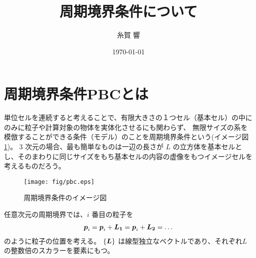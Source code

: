 \documentclass[a4j,12pt]{jarticle}
\title{周期境界条件について}
\author{糸賀 響}
\date{\today}
\def\vector#1{\mbox{\boldmath $#1$}}
\begin{document}
\maketitle \thispagestyle{empty}
\section{周期境界条件PBCとは}
単位セルを連続すると考えることで、有限大きさの１つセル（基本セル）の中にのみに粒子や計算対象の物体を実体化させるにも関わらず、
無限サイズの系を模倣することができる条件（モデル）のことを周期境界条件という(イメージ図\ref{fig:pbc})。
3 次元の場合、最も簡単なものは一辺の長さが $L$ の立方体を基本セルとし、そのまわりに同じサイズをもち基本セルの内容の虚像をもつイメージセルを考えるものだろう。
\begin{figure}[htbp]
   \begin{center}
   \texttt{[image: fig/pbc.eps]}
   \end{center}
   \caption{
   \label{fig:pbc}
      周期境界条件のイメージ図
   }
\end{figure}

任意次元の周期境界では、$i$ 番目の粒子を
\begin{eqnarray}
   \vector{p}_i = \vector{p}_i+\vector{L_1} = \vector{p}_i+\vector{L_2} = \ldots
\end{eqnarray}
のように粒子の位置を考える。
$\{\vector{L}\}$ は線型独立なベクトルであり、それぞれ$L$ の整数倍のスカラーを要素にもつ。
\end{document}

